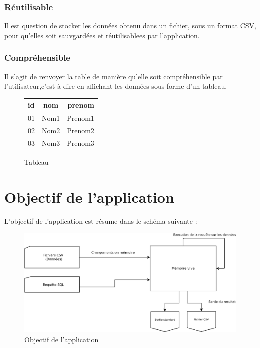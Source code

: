 \documentclass[oneside,13pt,a4paper]{report}
\begin{document}
\subsubsection{Réutilisable}

Il est question de stocker les données obtenu dans un fichier, sous un format CSV, pour qu'elles soit sauvgardées et réutilisablees par l'application.

\pagebreak

\subsubsection{Compréhensible}

Il s'agit de renvoyer la table de manière qu'elle soit compréhensible par l'utilisateur,c'est à dire en affichant les données sous forme d'un tableau.

\begin{figure}[h!]
	\centering
	\caption{Tableau}
	\vspace{0.1cm}
	\begin{tabular}{|l|c|r|}
		\hline
		id & nom  & prenom
		\\
		\hline
		01 & Nom1 & Prenom1 \\
		02 & Nom2 & Prenom2 \\
		03 & Nom3 & Prenom3 \\
		\hline
	\end{tabular}
\end{figure}

\section{Objectif de l'application}

L'objectif de l'application est résume dans le schéma suivante :
\begin{figure}[!h]
	\centering
	\includegraphics[width=1\textwidth]{img/role_prog.png}
	\vspace{0.1cm}
	\caption{Objectif de l'application}
\end{figure}
\end{document}
